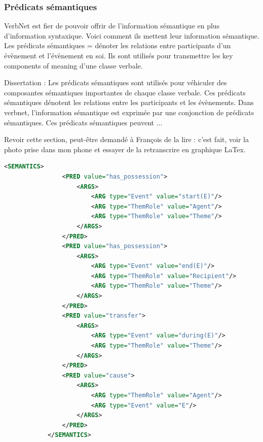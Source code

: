 \subsubsection{Prédicats sémantiques}

VerbNet est fier de pouvoir offrir de l'information sémantique en plus d'information syntaxique. Voici comment ils mettent leur information sémantique.
Les prédicats sémantiques = dénoter les relations entre participants d'un évènement et l'évènement en soi. Ils sont utilisés pour transmettre les key components of meaning d'une classe verbale.

Dissertation : Les prédicats sémantiques sont utilisés pour véhiculer des composantes sémantiques importantes de chaque classe verbale. Ces prédicats sémantiques dénotent les relations entre les participants et les évènements. Dans verbnet, l'information sémantique est exprimée par une conjonction de prédicats sémantiques. Ces prédicats sémantiques peuvent ...

Revoir cette section, peut-être demandé à François de la lire : c'est fait, voir la photo prise dans mon phone et essayer de la retranscrire en graphique LaTex.

\begin{lstlisting}[language=Xml, caption=Les prédicats sémantiques]
<SEMANTICS>
                <PRED value="has_possession">
                    <ARGS>
                        <ARG type="Event" value="start(E)"/>
                        <ARG type="ThemRole" value="Agent"/>
                        <ARG type="ThemRole" value="Theme"/>
                    </ARGS>
                </PRED>
                <PRED value="has_possession">
                    <ARGS>
                        <ARG type="Event" value="end(E)"/>
                        <ARG type="ThemRole" value="Recipient"/>
                        <ARG type="ThemRole" value="Theme"/>
                    </ARGS>
                </PRED>
                <PRED value="transfer">
                    <ARGS>
                        <ARG type="Event" value="during(E)"/>
                        <ARG type="ThemRole" value="Theme"/>
                    </ARGS>
                </PRED>
                <PRED value="cause">
                    <ARGS>
                        <ARG type="ThemRole" value="Agent"/>
                        <ARG type="Event" value="E"/>
                    </ARGS>
                </PRED>
            </SEMANTICS>
\end{lstlisting}

